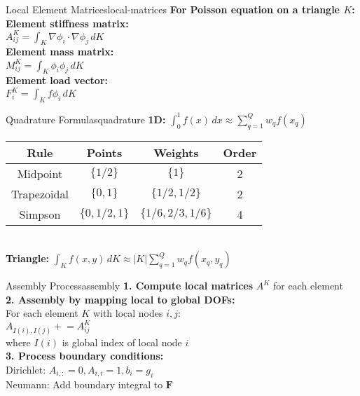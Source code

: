 \documentclass[10pt,a4paper,landscape]{article}
\begin{document}
\begin{multicols}{3}
\begin{formulabox}{Local Element Matrices}{local-matrices}
\textbf{For Poisson equation on a triangle $K$:} \\[0.5em]
\textbf{Element stiffness matrix:} \\
$A^K_{ij} = \int_K \nabla \phi_i \cdot \nabla \phi_j \, dK$ \\[0.5em]
\textbf{Element mass matrix:} \\
$M^K_{ij} = \int_K \phi_i \phi_j \, dK$ \\[0.5em]
\textbf{Element load vector:} \\
$F^K_i = \int_K f \phi_i \, dK$
\end{formulabox}

\begin{formulabox}{Quadrature Formulas}{quadrature}
\textbf{1D:} $\int_0^1 f(x) \, dx \approx \sum_{q=1}^Q w_q f(x_q)$ \\[0.5em]
\begin{tabular}{|c|c|c|c|}
\hline
\textbf{Rule} & \textbf{Points} & \textbf{Weights} & \textbf{Order} \\
\hline
Midpoint & $\{1/2\}$ & $\{1\}$ & 2 \\
Trapezoidal & $\{0,1\}$ & $\{1/2,1/2\}$ & 2 \\
Simpson & $\{0,1/2,1\}$ & $\{1/6,2/3,1/6\}$ & 4 \\
\hline
\end{tabular}\\[0.5em]
\textbf{Triangle:} $\int_K f(x,y) \, dK \approx |K| \sum_{q=1}^Q w_q f(x_q,y_q)$
\end{formulabox}

\begin{formulabox}{Assembly Process}{assembly}
\textbf{1. Compute local matrices} $A^K$ for each element \\[0.5em]
\textbf{2. Assembly by mapping local to global DOFs:} \\
For each element $K$ with local nodes $i,j$: \\
$A_{I(i),I(j)} \mathrel{+}= A^K_{ij}$ \\[0.5em]
where $I(i)$ is global index of local node $i$ \\[0.5em]
\textbf{3. Process boundary conditions:} \\
Dirichlet: $A_{i,:} = 0, A_{i,i} = 1, b_i = g_i$ \\
Neumann: Add boundary integral to $\mathbf{F}$
\end{formulabox}



\end{multicols}
\end{document}

